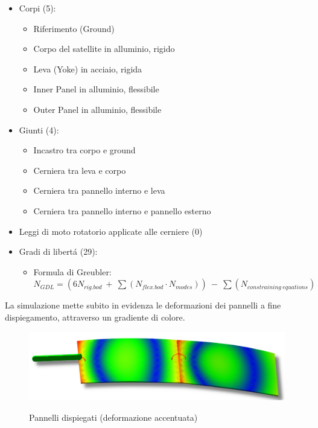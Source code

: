 \documentclass{article}
\begin{document}
        \begin{itemize}
            \item Corpi (5):
            \begin{itemize}
                \item Riferimento (Ground) 
                \item Corpo del satellite in alluminio, rigido
                \item Leva (Yoke) in acciaio, rigida
                \item Inner Panel in alluminio, flessibile
                \item Outer Panel in alluminio, flessibile
            \end{itemize}
            \item Giunti (4):
            \begin{itemize}
                \item Incastro tra corpo e ground
                \item Cerniera tra leva e corpo
                \item Cerniera tra pannello interno e leva
                \item Cerniera tra pannello interno e pannello esterno
            \end{itemize}
            \item Leggi di moto rotatorio applicate alle cerniere (0)
            \item Gradi di libertá (29):
            \begin{itemize}
                \item Formula di Greubler: \\ 
                $N_{GDL} = (6N_{rig.bod} \ + \ \sum (N_{flex.bod} \cdot N_{modes})) \ - \ \sum (N_{constraining \ equations}) $
            \end{itemize}
        \end{itemize}

        La simulazione mette subito in evidenza le deformazioni dei pannelli a fine dispiegamento, 
        attraverso un gradiente di colore.

            \begin{figure}[h!]
                 \label{fig:pannello_deformato}
                \includegraphics[width=\textwidth]{MUL2/Esercitazione4/pannello_flesso.png}
                \caption{Pannelli dispiegati (deformazione accentuata)}
            \end{figure}
\end{document}
